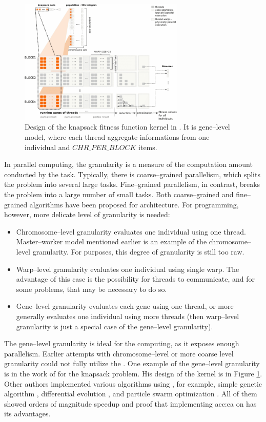 \begin{figure}[hb!]
    \centering
    \includegraphics[width=0.7\textwidth]{img/KnapsackKernelDesign.png}
    \caption[CUDA evaluation kernel of knapsack problem]{Design of the knapsack fitness function kernel in \citet{GpuIsland}. It is gene--level model, where each thread aggregate informations from one individual and $CHR\_PER\_BLOCK$ items.}
    \label{fig:knapsackkernel}
\end{figure}

In parallel computing, the granularity is a measure of the computation amount conducted by the task. Typically, there is coarse--grained parallelism, which splits the problem into several large tasks. Fine--grained parallelism, in contrast, breaks the problem into a large number of small tasks. Both coarse--grained and fine--grained algorithms have been proposed for \cpu architecture. For \gpu programming, however, more delicate level of granularity is needed:
\begin{itemize}
    \item Chromosome--level granularity evaluates one individual using one thread. Master--worker model mentioned earlier is an example of the chromosome--level granularity. For \cuda purposes, this degree of granularity is still too raw.
    \item Warp--level granularity evaluates one individual using single warp. The advantage of this case is the possibility for threads to communicate, and for some problems, that may be necessary to do so.
    \item Gene--level granularity evaluates each gene using one thread, or more generally evaluates one individual using more threads (then warp--level granularity is just a special case of the gene--level granularity).     
\end{itemize}
The gene--level granularity is ideal for the \gpu computing, as it exposes enough parallelism. Earlier attempts with chromosome--level or more coarse level granularity could not fully utilize the \gpuns. One example of the gene--level granularity is in the work of \citet*{GpuIsland} for the knapsack problem. His design of the \cuda kernel is in Figure \ref{fig:knapsackkernel}. Other authors implemented various algorithms using \cudans, for example, simple genetic algorithm \citep{SimpleGACUDA}, differential evolution \citep{veronese2010differential}, and particle swarm optimization \citep{PSOCUDA}. All of them showed orders of magnitude speedup and proof that implementing \acrlong{acc:ea} on \gpu has its advantages.
